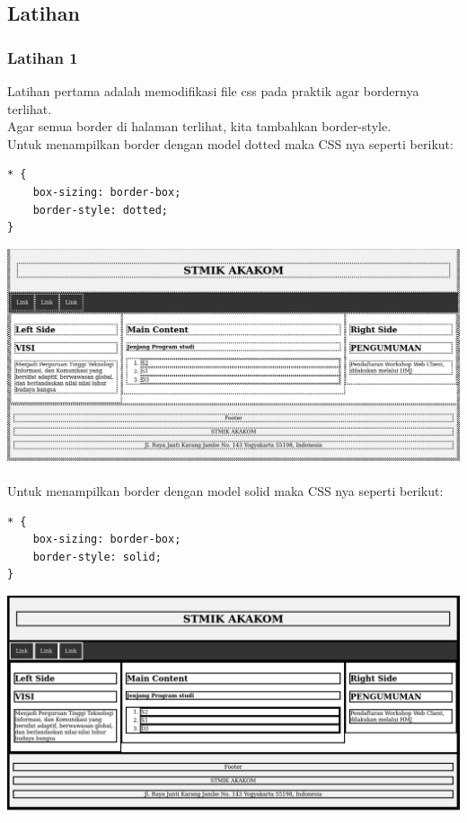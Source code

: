 \documentclass[a4paper,12pt]{article}
\begin{document}
\subsection{Latihan}
\subsubsection{Latihan 1}
Latihan pertama adalah memodifikasi file css pada praktik agar bordernya terlihat.\\
Agar semua border di halaman terlihat, kita tambahkan border-style.\\
Untuk menampilkan border dengan model dotted maka CSS nya seperti berikut:\\
\begin{lstlisting}
* {
    box-sizing: border-box;
    border-style: dotted;
}
\end{lstlisting}
\begin{center}
    \includegraphics[width=\linewidth]{2.png}
\end{center}

Untuk menampilkan border dengan model solid maka CSS nya seperti berikut:\\
\begin{lstlisting}
* {
    box-sizing: border-box;
    border-style: solid;
}
\end{lstlisting}
\begin{center}
    \includegraphics[width=\linewidth]{3.png}
\end{center}
\end{document}

